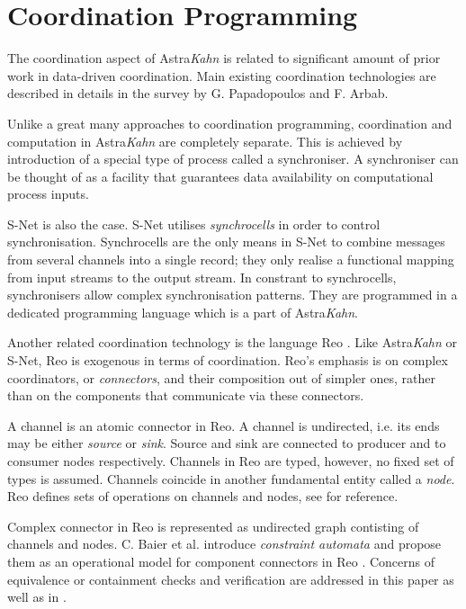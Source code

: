     \section{Coordination Programming}
The coordination aspect of Astra\emph{Kahn} is related to significant amount of prior work in data-driven coordination. Main existing coordination technologies are described in details in the survey \cite{papadopoulos} by G. Papadopoulos and F. Arbab.

Unlike a great many approaches to coordination programming, coordination and computation in Astra\emph{Kahn} are completely separate. This is achieved by introduction of a special type of process called a synchroniser. A synchroniser can be thought of as a facility that guarantees data availability on computational process inputs.

S-Net is also the case. S-Net utilises \emph{synchrocells} in order to control synchronisation. Synchrocells are the only means in S-Net to combine messages from several channels into a single record; they only realise a functional mapping from input streams to the output stream. In constrant to synchrocells, synchronisers allow complex synchronisation patterns. They are programmed in a dedicated programming language which is a part of Astra\emph{Kahn}.

Another related coordination technology is the language Reo \cite{Reo_Arbab04}. Like Astra\emph{Kahn} or S-Net, Reo is exogenous in terms of coordination. Reo's emphasis is on complex coordinators, or \emph{connectors}, and their composition out of simpler ones, rather than on the components that communicate via these connectors.

A channel is an atomic connector in Reo. A channel is undirected, i.e. its ends may be either \emph{source} or \emph{sink}. Source and sink are connected to producer and to consumer nodes respectively. Channels in Reo are typed, however, no fixed set of types is assumed. Channels coincide in another fundamental entity called a \emph{node}. Reo defines sets of operations on channels and nodes, see \cite{Reo_Arbab04} for reference.

Complex connector in Reo is represented as undirected graph contisting of channels and nodes. C. Baier et al. introduce \emph{constraint automata} and propose them as an operational model for component connectors in Reo \cite{baier_ca}. Concerns of equivalence or containment checks and verification are addressed in this paper as well as in \cite{Pourvatan}.


